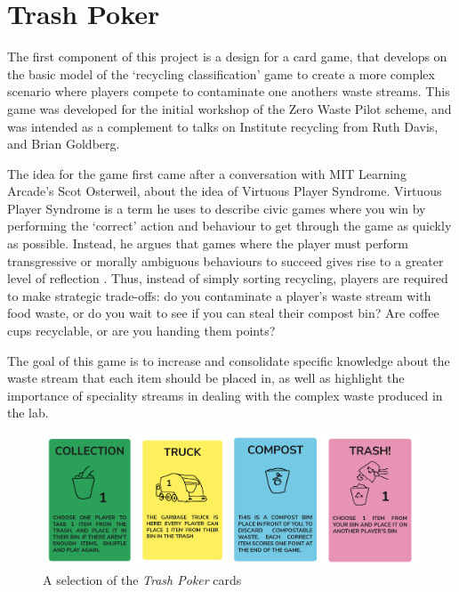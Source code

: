 \documentclass[nofonts,nols,justified,nobib]{tufte-book}
\begin{document}
\newpage

\section*{Trash Poker}

The first component of this project is a design for a card game, that develops on the basic model of the `recycling classification' game to create a more complex scenario where players compete to contaminate one anothers waste streams. This game was developed for the initial workshop of the Zero Waste Pilot scheme, and was intended as a complement to talks on Institute recycling from Ruth Davis, and Brian Goldberg.


The idea for the game first came after a conversation with MIT Learning Arcade's Scot Osterweil, about the idea of Virtuous Player Syndrome. Virtuous Player Syndrome is a term he uses to describe civic games where you win by performing the `correct' action and behaviour to get through the game as quickly as possible. Instead, he argues that games where the player must perform transgressive or morally ambiguous behaviours to succeed gives rise to a greater level of reflection \cite{osterweil_civic_2011}. Thus, instead of simply sorting recycling, players are required to make strategic trade-offs: do you contaminate a player's waste stream with food waste, or do you wait to see if you can steal their compost bin? Are coffee cups recyclable, or are you handing them points?

The goal of this game is to increase and consolidate specific knowledge about the waste stream that each item should be placed in, as well as highlight the importance of speciality streams in dealing with the complex waste produced in the lab.

\begin{figure}
  \caption{A selection of the \emph{Trash Poker} cards}
  \includegraphics[width=1\linewidth]{img/3/trashpoker.png}
\end{figure}
\end{document}
